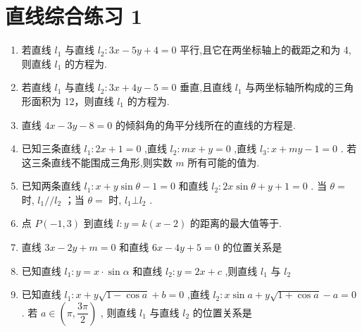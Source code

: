 \clearpage
\section*{直线综合练习 1}
\begin{enumerate}
    \item 若直线 ${l}_{1}$ 与直线 ${l}_{2} : {3x} - {5y} + 4 = 0$ 平行,且它在两坐标轴上的截距之和为 4,则直线 ${l}_{1}$ 的方程为.

    \item 若直线 ${l}_{1}$ 与直线 ${l}_{2} : {3x} + {4y} - 5 = 0$ 垂直,且直线 ${l}_{1}$ 与两坐标轴所构成的三角形面积为 12，则直线 ${l}_{1}$ 的方程为.

    \item 直线 ${4x} - {3y} - 8 = 0$ 的倾斜角的角平分线所在的直线的方程是.

    \item 已知三条直线 ${l}_{1} : {2x} + 1 = 0$ ,直线 ${l}_{2} : {mx} + y = 0$ ,直线 ${l}_{3} : x + {my} - 1 = 0$ . 若这三条直线不能围成三角形,则实数 $m$ 所有可能的值为.

    \item 已知两条直线 ${l}_{1} : x + y\sin \theta  - 1 = 0$ 和直线 ${l}_{2} : {2x}\sin \theta  + y + 1 = 0$ . 当 $\theta  =$ 时, ${l}_{1}//{l}_{2}$ ；当 $\theta  =$ 时, ${l}_{1}\bot {l}_{2}$ .

    \item 点 $P\left( {-1,3}\right)$ 到直线 $l : y = k\left( {x - 2}\right)$ 的距离的最大值等于.

    \item 直线 ${3x} - {2y} + m = 0$ 和直线 ${6x} - {4y} + 5 = 0$ 的位置关系是


    \item 已知直线 ${l}_{1} : y = x \cdot  \sin \alpha$ 和直线 ${l}_{2} : y = {2x} + c$ ,则直线 ${l}_{1}$ 与 ${l}_{2}$
    
    \item 已知直线 ${l}_{1} : x + y\sqrt{1 - \cos a} + b = 0$ ,直线 ${l}_{2} : x\sin a + y\sqrt{1 + \cos a} - a = 0$ . 若 $a \in  \left( {\pi ,\dfrac{3\pi }{2}}\right)$ , 则直线 ${l}_{1}$ 与直线 ${l}_{2}$ 的位置关系是
    

\end{enumerate}
